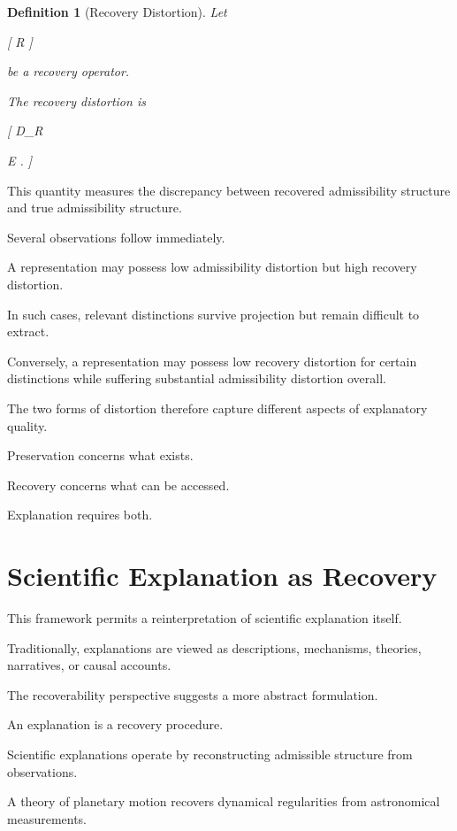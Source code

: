 \documentclass[11pt,oneside,openany]{book}
\newtheorem{definition}{Definition}[chapter] \newtheorem{theorem}{Theorem}[chapter] \newtheorem{proposition}{Proposition}[chapter] \newtheorem{lemma}{Lemma}[chapter] \newtheorem{corollary}{Corollary}[chapter] \newtheorem{remark}{Remark}[chapter]
\begin{document}
\begin{definition}[Recovery Distortion]

Let

[
R
]

be a recovery operator.

The recovery distortion is

[
D_R

\mathbb E
.
]

\end{definition}

This quantity measures the discrepancy between recovered admissibility structure and true admissibility structure.

Several observations follow immediately.

A representation may possess low admissibility distortion but high recovery distortion.

In such cases, relevant distinctions survive projection but remain difficult to extract.

Conversely, a representation may possess low recovery distortion for certain distinctions while suffering substantial admissibility distortion overall.

The two forms of distortion therefore capture different aspects of explanatory quality.

Preservation concerns what exists.

Recovery concerns what can be accessed.

Explanation requires both.

\section{Scientific Explanation as Recovery}

This framework permits a reinterpretation of scientific explanation itself.

Traditionally, explanations are viewed as descriptions, mechanisms, theories, narratives, or causal accounts.

The recoverability perspective suggests a more abstract formulation.

An explanation is a recovery procedure.

Scientific explanations operate by reconstructing admissible structure from observations.

A theory of planetary motion recovers dynamical regularities from astronomical measurements.
\end{document}
